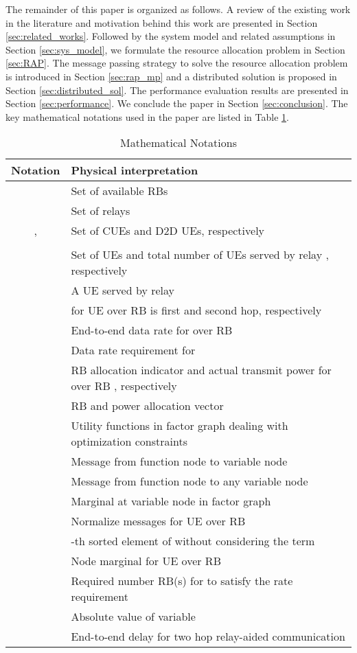 \documentclass[twocolumn,10pt]{IEEEtran}
\begin{document}
The remainder of this paper is organized as follows. A review of
the existing work in the literature and motivation behind this work are presented in Section \ref{sec:related_works}. Followed by the system model and related assumptions in Section \ref{sec:sys_model}, we formulate the resource allocation problem in Section \ref{sec:RAP}. The message passing strategy to solve the resource allocation problem is introduced in Section \ref{sec:rap_mp} and a distributed solution is proposed in Section \ref{sec:distributed_sol}. The performance evaluation  results are presented in Section \ref{sec:performance}.  We conclude the paper in Section \ref{sec:conclusion}. The key mathematical notations used in the paper are listed in Table \ref{tab:notations_mp}.


\begin{table}[!t]
\renewcommand{\arraystretch}{1.3}
\caption{Mathematical Notations}
\label{tab:notations_mp}
\centering
\begin{tabular}{c|p{5.2cm}}
\hline
\bfseries Notation & \bfseries Physical interpretation\\
\hline\hline
 & Set of available RBs \\
\hline  & Set of relays \\
\hline , & Set of CUEs and D2D UEs, respectively \\
 & \\
\hline  & Set of UEs and total number of UEs served by relay , respectively \\
\hline   & A UE served by relay  \\
\hline  &  for UE  over RB  is first and second hop, respectively \\
\hline  & End-to-end data rate for  over RB  \\
\hline  & Data rate requirement for \\
\hline  & RB allocation indicator and actual transmit power for  over RB , respectively \\
\hline  & RB and power allocation vector\\
\hline  & Utility functions in factor graph dealing with optimization constraints \\
\hline  & Message from function node  to variable node  \\
\hline  & Message from  function node to any variable node   \\
\hline  & Marginal at variable node  in factor graph \\
\hline   & Normalize messages for UE  over RB  \\
\hline  & -th sorted element of  without considering the term  \\
\hline  & Node marginal for UE  over RB  \\
\hline  & Required number RB(s) for  to satisfy the rate requirement \\
\hline  & Absolute value of variable  \\
\hline  & End-to-end delay for two hop relay-aided communication \\
\hline 
\end{tabular}
\end{table}
\end{document}
